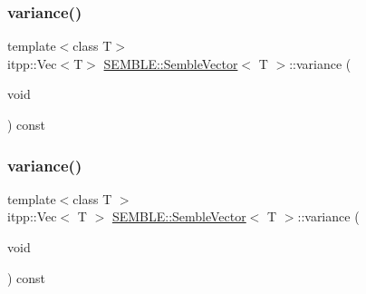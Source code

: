 \mbox{\label{structSEMBLE_1_1SembleVector_ae871833a81a7133e0bbefaac47017c3a}} 
\subsubsection{\texorpdfstring{variance()}{variance()}\hspace{0.1cm}{\footnotesize\ttfamily [1/2]}}
{\footnotesize\ttfamily template$<$class T$>$ \\
itpp\+::\+Vec$<$T$>$ \mbox{\hyperlink{structSEMBLE_1_1SembleVector}{S\+E\+M\+B\+L\+E\+::\+Semble\+Vector}}$<$ T $>$\+::variance (\begin{DoxyParamCaption}\item[{void}]{ }\end{DoxyParamCaption}) const}

\mbox{\label{structSEMBLE_1_1SembleVector_a105aedbde26eb3678ee4721e2e38ceda}} 
\subsubsection{\texorpdfstring{variance()}{variance()}\hspace{0.1cm}{\footnotesize\ttfamily [2/2]}}
{\footnotesize\ttfamily template$<$class T $>$ \\
itpp\+::\+Vec$<$ T $>$ \mbox{\hyperlink{structSEMBLE_1_1SembleVector}{S\+E\+M\+B\+L\+E\+::\+Semble\+Vector}}$<$ T $>$\+::variance (\begin{DoxyParamCaption}\item[{void}]{ }\end{DoxyParamCaption}) const}

